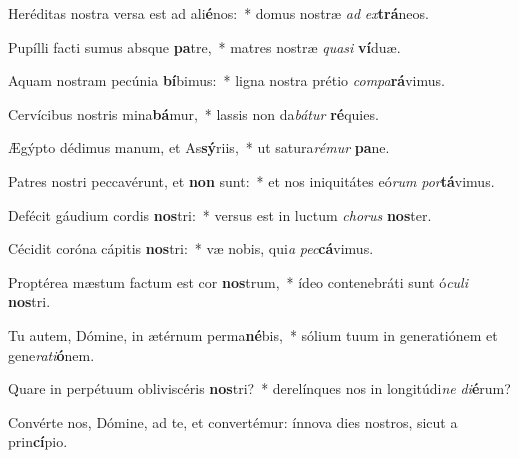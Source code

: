 \item Heréditas nostra versa est ad ali\textbf{é}nos:~* domus nostræ \textit{ad} \textit{ex}\textbf{trá}neos.
\item Pupílli facti sumus absque \textbf{pa}tre,~* matres nostræ \textit{qua}\textit{si} \textbf{ví}duæ.
\item Aquam nostram pecúnia \textbf{bí}bimus:~* ligna nostra prétio \textit{com}\textit{pa}\textbf{rá}vimus.
\item Cervícibus nostris mina\textbf{bá}mur,~* lassis non da\textit{bá}\textit{tur} \textbf{ré}quies.
\item Ægýpto dédimus manum, et As\textbf{sý}riis,~* ut satura\textit{ré}\textit{mur} \textbf{pa}ne.
\item Patres nostri peccavérunt, et \textbf{non} sunt:~* et nos iniquitátes eó\textit{rum} \textit{por}\textbf{tá}vimus.
\item Defécit gáudium cordis \textbf{nos}tri:~* versus est in luctum \textit{cho}\textit{rus} \textbf{nos}ter.
\item Cécidit coróna cápitis \textbf{nos}tri:~* væ nobis, qui\textit{a} \textit{pec}\textbf{cá}vimus.
\item Proptérea mæstum factum est cor \textbf{nos}trum,~* ídeo contenebráti sunt ó\textit{cu}\textit{li} \textbf{nos}tri.
\item Tu autem, Dómine, in ætérnum perma\textbf{né}bis,~* sólium tuum in generatiónem et gene\textit{ra}\textit{ti}\textbf{ó}nem.
\item Quare in perpétuum obliviscéris \textbf{nos}tri?~* derelínques nos in longitúdi\textit{ne} \textit{di}\textbf{é}rum?
\item Convérte nos, Dómine, ad te, et convertémur: ínnova dies nostros, sicut a prin\textbf{cí}pio.
